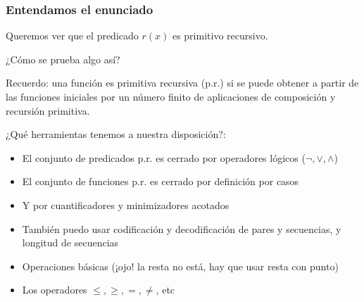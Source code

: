 \documentclass[10pt]{beamer}
\begin{document}
\begin{frame}
\frametitle{Entendamos el enunciado}

Queremos ver que el predicado $r(x)$ es primitivo recursivo.

¿Cómo se prueba algo así? \pause

Recuerdo: una función es primitiva recursiva (p.r.) si se puede obtener a partir de las funciones iniciales por un número finito de aplicaciones de composición y recursión primitiva. \pause%


¿Qué herramientas tenemos a nuestra disposición?: \pause



\begin{itemize}
	\item El conjunto de predicados p.r. es cerrado por operadores lógicos ($\neg, \lor, \land$) %
	\item El conjunto de funciones p.r. es cerrado por definición por casos %
	\item Y por cuantificadores y minimizadores acotados %
	\item También puedo usar codificación y decodificación de pares y secuencias, y longitud de secuencias
	\item Operaciones básicas (¡ojo! la resta no está, hay que usar resta con punto)
	\item Los operadores $\leq,\geq,=,\neq$, etc
\end{itemize}

\end{frame}
\end{document}
